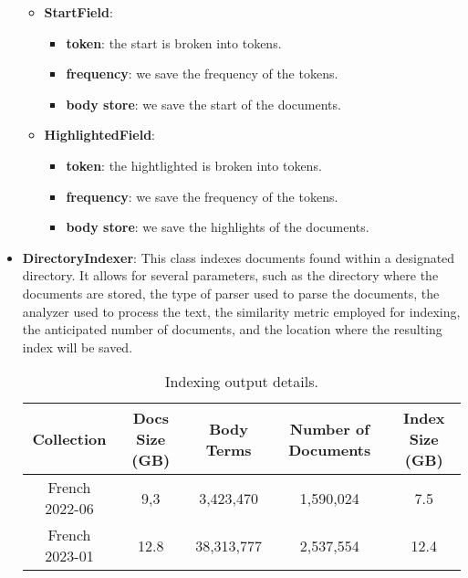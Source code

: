 \begin{itemize}
\begin{itemize}
\begin{itemize}
                                  \end{itemize}
                                  \item \textbf{StartField}: \begin{itemize}
                                                                 \item \textbf{token}: the start is broken into tokens.
                                                                 \item \textbf{frequency}: we save the frequency of the tokens.
                                                                 \item \textbf{body store}: we save the start of the documents.
                                  \end{itemize}
                                  \item \textbf{HighlightedField}: \begin{itemize}
                                                                 \item \textbf{token}: the hightlighted is broken into tokens.
                                                                 \item \textbf{frequency}: we save the frequency of the tokens.
                                                                 \item \textbf{body store}: we save the highlights of the documents.
                                  \end{itemize}
    \end{itemize}
    \item \textbf{DirectoryIndexer}: \newline
    \setlength\parindent{24pt} This class indexes documents found within a designated directory. It allows for several parameters, such as the directory where the documents are stored, the type of parser used to parse the documents, the analyzer used to process the text, the similarity metric employed for indexing, the anticipated number of documents, and the location where the resulting index will be saved.

        \begin{center}
        \begin{table}[h]
            \centering
            \begin{tabular}{|c|c|c|c|c|}
                \hline
                Collection & Docs Size (GB) & Body Terms & Number of Documents & Index Size (GB) \\
                \hline
                French 2022-06 & 9,3 & 3,423,470 & 1,590,024 & 7.5 \\
                \hline
                French 2023-01 & 12.8 & 38,313,777 & 2,537,554 & 12.4 \\
                \hline
            \end{tabular}
            \caption{Indexing output details.}
            \label{tab:Indexing_details}
        \end{table}
    \end{center}

\end{itemize}

